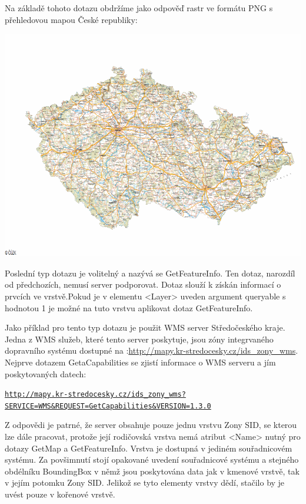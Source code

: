 \documentclass[a4paper,12pt]{article}
\begin{document}
Na základě tohoto dotazu obdržíme jako odpověď rastr ve formátu PNG s přehledovou mapou České republiky:

 \includegraphics[scale=0.5]{figures/GetMapResponse}


Poslední typ dotazu je volitelný a nazývá se GetFeatureInfo. Ten dotaz, narozdíl od předchozích, nemusí server podporovat.
Dotaz slouží k získán informací o prvcích ve vrstvě.Pokud je v elementu <Layer> uveden argument  queryable 
s hodnotou 1 je možné na tuto vrstvu aplikovat dotaz GetFeatureInfo.  

Jako příklad pro tento typ dotazu je použit WMS server Středočeského kraje. Jedna z WMS služeb, které tento server poskytuje, jsou zóny integrvaného dopravního systému dostupné
na :\url{http://mapy.kr-stredocesky.cz/ids_zony_wms}. 
Nejprve dotazem GetaCapabilities se zjistí informace o WMS serveru a jím poskytovaných datech:

\newcommand{\StredoceskygetCap}{http://mapy.kr-stredocesky.cz/ids_zony_wms?SERVICE=WMS&REQUEST=GetCapabilities}
\begin{alltt}\footnotesize
\href{\StredoceskygetCap}{http://mapy.kr-stredocesky.cz/ids\_zony\_wms?}
\href{\StredoceskygetCap}{SERVICE=WMS\&REQUEST=GetCapabilities\&VERSION=1.3.0}
\end{alltt}

Z odpovědi je patrné, že server obsahuje pouze jednu vrstvu Zony SID, se kterou lze dále pracovat, protože její rodičovská vrstva nemá atribut <Name> nutný pro dotazy GetMap a GetFeatureInfo.
Vrstva je dostupná v jediném souřadnicovém systému. Za povšimnutí stojí opakované uvedení souřadnicové systému a stejného obdélníku BoundingBox v němž jsou poskytována data 
jak v kmenové vrstvě, tak v jejím potomku Zony SID. Jelikož se tyto elementy vrstvy dědí, stačilo by je uvést pouze v kořenové vrstvě.
\end{document}

